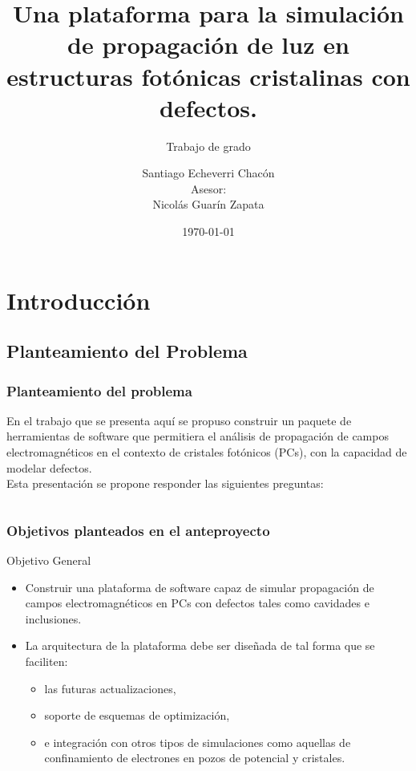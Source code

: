 \documentclass[xcolor=table,serif]{beamer}
\date{\today}
\author[]{Santiago Echeverri Chac\'on\\ Asesor: \\ Nicol\'as Guar\'in Zapata}
\title[Trabajo de grado]{Una plataforma para la simulación de propagación de luz en estructuras fotónicas cristalinas con defectos.}
\subtitle{Trabajo de grado}
\institute{Universidad EAFIT}
\begin{document}
\begin{frame}
\titlepage
\end{frame}
\AtBeginSection[]
		{
			 \begin{frame}
			  \frametitle{Contenido}
			  \small
		  	\tableofcontents[currentsection]%
			  \normalsize
 			\end{frame}
		}
\section{Introducción}
		
	\subsection{Planteamiento del Problema}
	\begin{frame}
	\frametitle{Planteamiento del problema}
	\justifying
	En el trabajo que se presenta aquí se propuso construir un paquete de herramientas de software que permitiera el análisis de propagación de campos electromagnéticos en el contexto de cristales fotónicos (PCs), con la capacidad de modelar defectos.  \\
	\pause
	Esta presentación se propone responder las siguientes preguntas:
	\vskip20pt
	\begin{columns}[t]
	\end{columns}

	\end{frame}
	\begin{frame}
	\frametitle{Objetivos planteados en el anteproyecto}
		\begin{block}{Objetivo General}
		\begin{itemize}
			\pause
			\item Construir una plataforma de software capaz de simular propagación de campos electromagnéticos en PCs con defectos tales como cavidades e inclusiones.
			\pause
			\item La arquitectura de la plataforma debe ser diseñada de tal forma que se faciliten: 
			\begin{itemize}
				\pause
				\item las futuras actualizaciones,
				\pause
				\item soporte de esquemas de optimización,
				\pause
				\item e integración con otros tipos de simulaciones como aquellas de confinamiento de electrones en pozos de potencial y cristales. 	
			\end{itemize}
		\end{itemize}
		\end{block}
		\end{frame}
\end{document}

